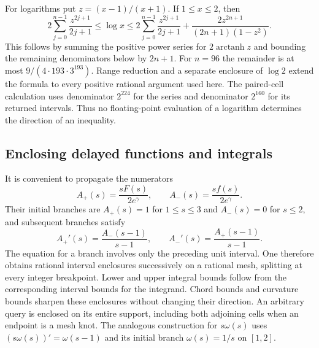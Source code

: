 For logarithms put $z=(x-1)/(x+1)$.  If $1\le x\le2$, then
\begin{equation}
 2\sum_{j=0}^{n-1}\frac{z^{2j+1}}{2j+1}
 \le\log x\le
 2\sum_{j=0}^{n-1}\frac{z^{2j+1}}{2j+1}
 +\frac{2z^{2n+1}}{(2n+1)(1-z^2)}.
 \label{num:log-enclosure}
\end{equation}
This follows by summing the positive power series for
$2\operatorname{arctanh}z$ and bounding the remaining denominators
below by $2n+1$.  For $n=96$ the remainder is at most
$9/(4\cdot193\cdot3^{193})$.  Range reduction and a separate
enclosure of $\log2$ extend the formula to every positive rational
argument used here.  The paired-cell calculation uses denominator
$2^{224}$ for the series and denominator $2^{160}$ for its returned
intervals.  Thus no floating-point evaluation of a logarithm determines
the direction of an inequality.

\subsection{Enclosing delayed functions and integrals}
It is convenient to propagate the numerators
\[
 A_+(s)=\frac{sF(s)}{2e^\gamma},\qquad
 A_-(s)=\frac{sf(s)}{2e^\gamma}.
\]
Their initial branches are $A_+(s)=1$ for $1\le s\le3$ and
$A_-(s)=0$ for $s\le2$, and subsequent branches satisfy
\[
 A_+'(s)=\frac{A_-(s-1)}{s-1},\qquad
 A_-'(s)=\frac{A_+(s-1)}{s-1}.
\]
The equation for a branch involves only the preceding unit interval.
One therefore obtains rational interval enclosures successively on a
rational mesh, splitting at every integer breakpoint.  Lower and upper
integral bounds follow from the corresponding interval bounds for the
integrand.  Chord bounds and curvature bounds sharpen these enclosures
without changing their direction.  An arbitrary query is enclosed on
its entire support, including both adjoining cells when an endpoint
is a mesh knot.  The analogous construction for $s\omega(s)$ uses
$(s\omega(s))'=\omega(s-1)$ and its initial branch
$\omega(s)=1/s$ on $[1,2]$.
